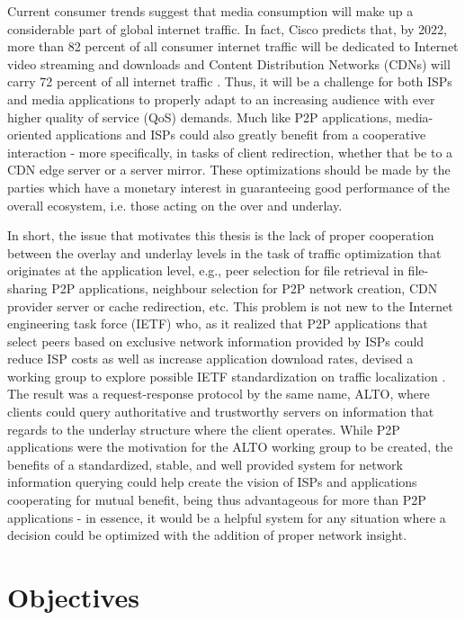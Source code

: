    Current consumer trends suggest that media consumption will make up a considerable part of global internet traffic.
    In fact, Cisco predicts that, by 2022, more than 82 percent of all consumer internet traffic will be dedicated to Internet video streaming and downloads and Content Distribution Networks (CDNs) will carry 72 percent of all internet traffic \cite{cisco} .
    Thus, it will be a challenge for both ISPs and media applications to properly adapt to an increasing audience with ever higher quality of service (QoS) demands.
    Much like P2P applications, media-oriented applications and ISPs could also greatly benefit from a cooperative interaction - more specifically, in tasks of client redirection, whether that be to a CDN edge server or a server mirror.
    These optimizations should be made by the parties which have a monetary interest in guaranteeing good performance of the overall ecosystem, i.e. those acting on the over and underlay.

    In short, the issue that motivates this thesis is the lack of proper cooperation between the overlay and underlay levels in the task of traffic optimization that originates at the application level, e.g., peer selection for file retrieval in file-sharing P2P applications, neighbour selection for P2P network creation, CDN provider server or cache redirection, etc.
    This problem is not new to the Internet engineering task force (IETF) who, as it realized that P2P applications that select peers based on exclusive network information provided by ISPs could reduce ISP costs as well as increase application download rates, devised a working group to explore possible IETF standardization on traffic localization \cite{seedorf2009}.
    The result was a request-response protocol by the same name, ALTO, where clients could query authoritative and trustworthy servers on information that regards to the underlay structure where the client operates.
    While P2P applications were the motivation for the ALTO working group to be created, the benefits of a standardized, stable, and well provided system for network information querying could help create the vision of ISPs and applications cooperating for mutual benefit, being thus advantageous for more than P2P applications - in essence, it would be a helpful system for any situation where a decision could be optimized with the addition of proper network insight.

\section{Objectives}

